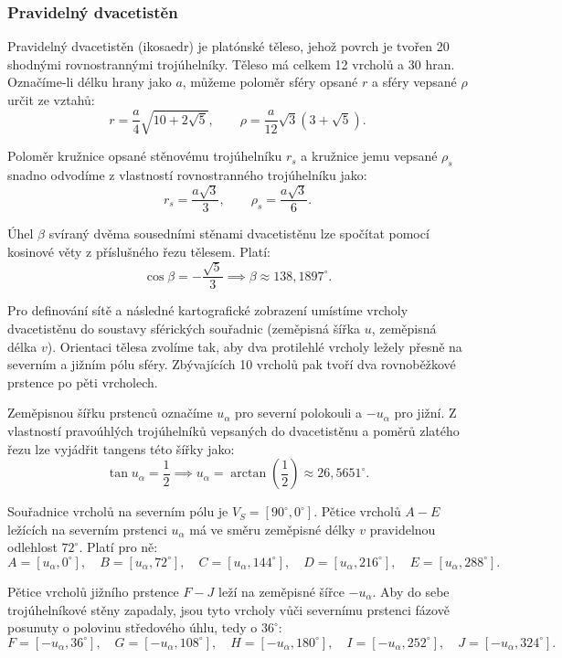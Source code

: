 \documentclass[12pt]{article}
\begin{document}
{\subsubsection {Pravidelný dvacetistěn}}
Pravidelný dvacetistěn (ikosaedr) je platónské těleso, jehož povrch je tvořen 20 shodnými rovnostrannými trojúhelníky. Těleso má celkem 12 vrcholů a 30 hran. Označíme-li délku hrany jako $a$, můžeme poloměr sféry opsané $r$ a sféry vepsané $\rho$ určit ze vztahů:
\[
    r = \frac{a}{4}\sqrt{10 + 2\sqrt{5}}, \qquad \rho = \frac{a}{12}\sqrt{3}(3 + \sqrt{5}).
\]

Poloměr kružnice opsané stěnovému trojúhelníku $r_s$ a kružnice jemu vepsané $\rho_s$ snadno odvodíme z vlastností rovnostranného trojúhelníku jako:
\[
    r_s = \frac{a\sqrt{3}}{3}, \qquad \rho_s = \frac{a\sqrt{3}}{6}.
\]

Úhel $\beta$ svíraný dvěma sousedními stěnami dvacetistěnu lze spočítat pomocí kosinové věty z příslušného řezu tělesem. Platí:
\[
    \cos\beta = -\frac{\sqrt{5}}{3} \implies \beta \approx 138{,}1897^\circ.
\]

Pro definování sítě a následné kartografické zobrazení umístíme vrcholy dvacetistěnu do soustavy sférických souřadnic (zeměpisná šířka $u$, zeměpisná délka $v$). Orientaci tělesa zvolíme tak, aby dva protilehlé vrcholy ležely přesně na severním a jižním pólu sféry. Zbývajících 10 vrcholů pak tvoří dva rovnoběžkové prstence po pěti vrcholech.

Zeměpisnou šířku prstenců označíme $u_\alpha$ pro severní polokouli a $-u_\alpha$ pro jižní. Z vlastností pravoúhlých trojúhelníků vepsaných do dvacetistěnu a poměrů zlatého řezu lze vyjádřit tangens této šířky jako:
\[
    \tan u_\alpha = \frac{1}{2} \implies u_\alpha = \arctan\left(\frac{1}{2}\right) \approx 26{,}5651^\circ.
\]

Souřadnice vrcholů na severním pólu je $V_S = [90^\circ, 0^\circ]$. Pětice vrcholů $A-E$ ležících na severním prstenci $u_\alpha$ má ve směru zeměpisné délky $v$ pravidelnou odlehlost $72^\circ$. Platí pro ně:
\[
    A = [u_\alpha, 0^\circ], \quad B = [u_\alpha, 72^\circ], \quad C = [u_\alpha, 144^\circ], \quad D = [u_\alpha, 216^\circ], \quad E = [u_\alpha, 288^\circ].
\]

Pětice vrcholů jižního prstence $F-J$ leží na zeměpisné šířce $-u_\alpha$. Aby do sebe trojúhelníkové stěny zapadaly, jsou tyto vrcholy vůči severnímu prstenci fázově posunuty o polovinu středového úhlu, tedy o $36^\circ$:
\[
    F = [-u_\alpha, 36^\circ], \quad G = [-u_\alpha, 108^\circ], \quad H = [-u_\alpha, 180^\circ], \quad I = [-u_\alpha, 252^\circ], \quad J = [-u_\alpha, 324^\circ].
\]
\end{document}
